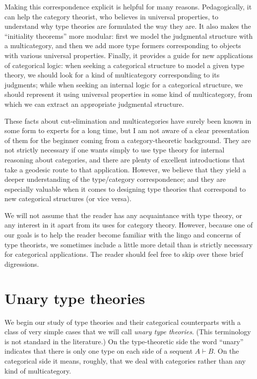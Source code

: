 \documentclass{book}
\let\types\vdash
\begin{document}
Making this correspondence explicit is helpful for many reasons.
Pedagogically, it can help the category theorist, who believes in universal properties, to understand why type theories are formulated the way they are.
It also makes the ``initiality theorems'' more modular: first we model the judgmental structure with a multicategory, and then we add more type formers corresponding to objects with various universal properties.
Finally, it provides a guide for new applications of categorical logic: when seeking a categorical structure to model a given type theory, we should look for a kind of multicategory corresponding to its judgments; while when seeking an internal logic for a categorical structure, we should represent it using universal properties in some kind of multicategory, from which we can extract an appropriate judgmental structure.

These facts about cut-elimination and multicategories have surely been known in some form to experts for a long time, but I am not aware of a clear presentation of them for the beginner coming from a category-theoretic background.
They are not strictly necessary if one wants simply to use type theory for internal reasoning about categories, and there are plenty of excellent introductions that take a geodesic route to that application.
However, we believe that they yield a deeper understanding of the type/category correspondence; and they are especially valuable when it comes to designing type theories that correspond to new categorical structures (or vice versa).

We will not assume that the reader has any acquaintance with type theory, or any interest in it apart from its uses for category theory.
However, because one of our goals is to help the reader become familiar with the lingo and concerns of type theorists, we sometimes include a little more detail than is strictly necessary for categorical applications.
The reader should feel free to skip over these brief digressions.



\chapter{Unary type theories}
\label{chap:unary}

We begin our study of type theories and their categorical counterparts with a class of very simple cases that we will call \emph{unary type theories}.
(This terminology is not standard in the literature.)
On the type-theoretic side the word ``unary'' indicates that there is only one type on each side of a sequent $A\types B$.
On the categorical side it means, roughly, that we deal with categories rather than any kind of multicategory.
\end{document}
